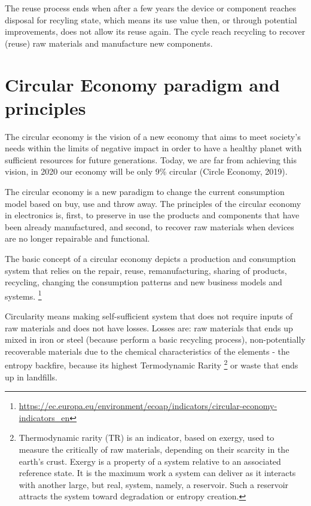 \documentclass[
]{book}
\begin{document}
The reuse process ends when after a few years the device or component reaches disposal for recyling state, which means its use value then, or through potential improvements, does not allow its reuse again. The cycle reach recycling to recover (reuse) raw materials and manufacture new components.

\hypertarget{circular-economy-paradigm-and-principles}{%
\section{Circular Economy paradigm and principles}\label{circular-economy-paradigm-and-principles}}

The circular economy is the vision of a new economy that aims to meet society's needs within the limits of negative impact in order to have a healthy planet with sufficient resources for future generations. Today, we are far from achieving this vision, in 2020 our economy will be only 9\% circular (Circle Economy, 2019).

The circular economy is a new paradigm to change the current consumption model based on buy, use and throw away. The principles of the circular economy in electronics is, first, to preserve in use the products and components that have been already manufactured, and second, to recover raw materials when devices are no longer repairable and functional.

The basic concept of a circular economy depicts a production and consumption system that relies on the repair, reuse, remanufacturing, sharing of products, recycling, changing the consumption patterns and new business models and systems. \footnote{\url{https://ec.europa.eu/environment/ecoap/indicators/circular-economy-indicators_en}}

Circularity means making self-sufficient system that does not require inputs of raw materials and does not have losses. Losses are: raw materials that ends up mixed in iron or steel (because perform a basic recycling process), non-potentially recoverable materials due to the chemical characteristics of the elements - the entropy backfire, because its highest Termodynamic Rarity \footnote{Thermodynamic rarity (TR) is an indicator, based on exergy, used to measure the critically of raw materials, depending on their scarcity in the earth's crust. Exergy is a property of a system relative to an associated reference state. It is the maximum work a system can deliver as it interacts with another large, but real, system, namely, a reservoir. Such a reservoir attracts the system toward degradation or entropy creation.} or waste that ends up in landfills.
\end{document}
